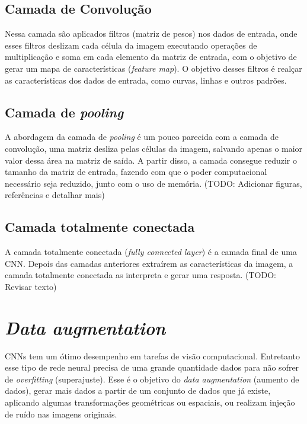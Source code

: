 \subsection{Camada de Convolução}\label{cap_conceitos_cnn_conv}
Nessa camada são aplicados filtros (matriz de pesos) nos dados de entrada,
onde esses filtros deslizam cada célula da imagem executando operações de multiplicação e soma
em cada elemento da matriz de entrada, com o objetivo de gerar um mapa de características (\textit{feature map}).
O objetivo desses filtros é realçar as características dos dados de entrada, como curvas, linhas e outros padrões.

\subsection{Camada de \textit{pooling}}\label{cap_conceitos_cnn_pooling}
A abordagem da camada de \textit{pooling} é um pouco parecida com a camada de convolução,
uma matriz desliza pelas células da imagem, salvando apenas o maior valor dessa área na matriz de saída.
A partir disso, a camada consegue reduzir o tamanho da matriz de entrada, fazendo com que o poder computacional
necessário seja reduzido, junto com o uso de memória.
(TODO: Adicionar figuras, referências e detalhar mais)

\subsection{Camada totalmente conectada}\label{cap_conceitos_cnn_totalmente}
A camada totalmente conectada (\textit{fully connected layer}) é a camada final de uma CNN.
Depois das camadas anteriores extraírem as características da imagem, a camada totalmente
conectada as interpreta e gerar uma resposta.
(TODO: Revisar texto)

\section{\textit{Data augmentation}}
CNNs tem um ótimo desempenho em tarefas de visão computacional. Entretanto esse tipo de rede neural precisa de uma
grande quantidade dados para não sofrer de \textit{overfitting} (superajuste). \cite{shorten2019survey}
Esse é o objetivo do \textit{data augmentation} (aumento de dados), gerar mais dados a partir de um conjunto de dados
que já existe, aplicando algumas transformações geométricas ou espaciais, ou realizam injeção de ruído nas imagens
originais.

